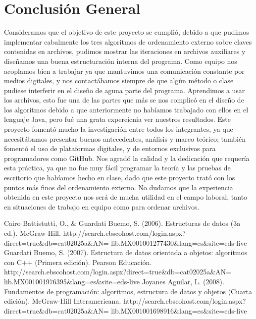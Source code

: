 \documentclass[11pt]{article}
\begin{document}
\section{Conclusión General}
\par
Consideramos que el objetivo de este proyecto se cumplió, debido a que pudimos implementar cabalmente los tres algoritmos de ordenamiento externo sobre claves contenidas en archivos, pudimos mostrar las iteraciones en archivos auxiliares
y diseñamos una buena estructuración interna del programa. Como equipo nos acoplamos bien a trabajar ya que mantuvimos una comunicación constante por medios digitales, y nos contactábamos siempre de que algún método
o clase pudiese interferir en el diseño de aguna parte del programa. Aprendimos a usar los archivos, esto fue una de las partes que más se nos complicó en el diseño de los algoritmos debido a que anteriormente no habíamos trabajado con ellos
en el lenguaje Java, pero fué una grata expereicnia ver nuestros resultados. Este proyecto fomentó mucho la investigación entre todos los integrantes, ya que necesitábamos presentar buenos antecedentes, análisis y marco teórico; también fomentó
el uso de plataformas digitales, y de entornos exclusivos para programadores como GitHub. Nos agradó la calidad y la dedicación que requería esta práctica, ya que no fue muy fácil programar la teoría y las pruebas de escritorio que habíamos hecho en clase, dado que
este proyecto trató con los puntos más finos del ordenamiento externo. No dudamos que la experiencia obtenida en este proyecto nos será de mucha utilidad en el campo laboral, tanto en situaciones de trabajo en equipo como para ordenar archivos. 

\begin{thebibliography}{0}
 Cairo Battistutti, O., \& Guardati Buemo, S. (2006). Estructuras de datos (3a ed.). 
McGraw-Hill. http://search.ebscohost.com/login.aspx?direct=true\&db=cat02025a\&AN=
lib.MX001001277430\&lang=es\&site=eds-live
 Guardati Buemo, S. (2007). Estructura de datos orientada a objetos: algoritmos con C++ (Primera edición). 
Pearson Educación. http://search.ebscohost.com/login.aspx?direct=true\&db=cat02025a\&AN=
lib.MX001001976395\&lang=es\&site=eds-live
 Joyanes Aguilar, L. (2008). Fundamentos de programación: algoritmos, estructura de datos y objetos (Cuarta edición). 
McGraw-Hill Interamericana. http://search.ebscohost.com/login.aspx?direct=true\&db=cat02025a\&AN=
lib.MX001001698916\&lang=es\&site=eds-live
\end{thebibliography}
\end{document}
